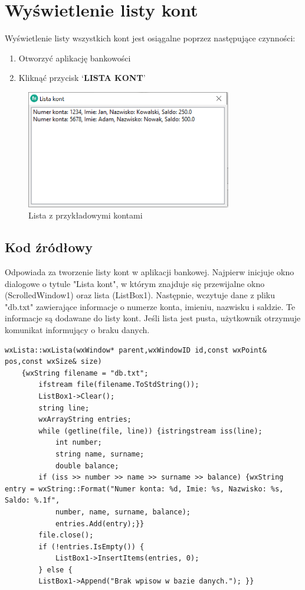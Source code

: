 \documentclass[a4paper,12pt]{article}
\begin{document}
	\section{Wyświetlenie listy kont}
	Wyświetlenie listy wszystkich kont jest osiągalne poprzez następujące czynności:
	\begin{enumerate}
		\item Otworzyć aplikację bankowości
		\item Kliknąć przycisk ‘\textbf{LISTA KONT}’
	\end{enumerate}

\begin{figure}[h]
	\centering
	\includegraphics[width=0.8\textwidth]{lista.png}
	\caption{Lista z przykładowymi kontami}
	\label{lista}
\end{figure}
\subsection{Kod źródłowy}
Odpowiada za tworzenie listy kont w aplikacji bankowej. Najpierw inicjuje okno dialogowe o tytule "Lista kont", w którym znajduje się przewijalne okno (ScrolledWindow1) oraz lista (ListBox1). Następnie, wczytuje dane z pliku "db.txt" zawierające informacje o numerze konta, imieniu, nazwisku i saldzie. Te informacje są dodawane do listy kont. Jeśli lista jest pusta, użytkownik otrzymuje komunikat informujący o braku danych.
\begin{lstlisting}
wxLista::wxLista(wxWindow* parent,wxWindowID id,const wxPoint& pos,const wxSize& size)
	{wxString filename = "db.txt";
		ifstream file(filename.ToStdString());
		ListBox1->Clear();
		string line;
		wxArrayString entries;
		while (getline(file, line)) {istringstream iss(line);
			int number;
			string name, surname;
			double balance;
		if (iss >> number >> name >> surname >> balance) {wxString entry = wxString::Format("Numer konta: %d, Imie: %s, Nazwisko: %s, Saldo: %.1f",
			number, name, surname, balance);
			entries.Add(entry);}}
		file.close();
		if (!entries.IsEmpty()) {
			ListBox1->InsertItems(entries, 0);
		} else {
		ListBox1->Append("Brak wpisow w bazie danych."); }}
\end{lstlisting}
\end{document}
